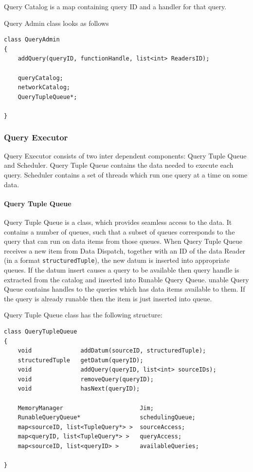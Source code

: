 \documentclass[11pt]{article}
\begin{document}
Query Catalog is a map containing query ID and a handler for that query. 

Query Admin class looks as follows
\begin{verbatim}
class QueryAdmin
{
    addQuery(queryID, functionHandle, list<int> ReadersID);

	queryCatalog;
	networkCatalog;
	QueryTupleQueue*;
	
}
\end{verbatim}

\subsubsection{Query Executor}

Query Executor consists of two inter dependent components: Query Tuple Queue and Scheduler. Query Tuple Queue contains the data needed to execute each query. Scheduler contains a set of threads which run one query at a time on some data.  

\paragraph{Query Tuple Queue}

Query Tuple Queue is a class, which provides seamless access to the data. It contains a number of queues, such that a subset of queues corresponds to the query that can run on data items from those queues. When Query Tuple Queue receives a new item from Data Dispatch, together with an ID of the data Reader (in a format {\tt structuredTuple}), the new datum is inserted into appropriate queues. If the datum insert causes a query to be available then query handle is extracted from the catalog and inserted into Runable Query Queue. unable Query Queue contains handles to the queries which has data items available to them. If the query is already runable then the item is just inserted into queue.

Query Tuple Queue class has the following structure:

\begin{verbatim}
class QueryTupleQueue
{
    void              addDatum(sourceID, structuredTuple);
    structuredTuple   getDatum(queryID);
    void              addQuery(queryID, list<int> sourceIDs);
    void              removeQuery(queryID);
    void              hasNext(queryID);

	MemoryManager                      Jim;
	RunableQueryQueue*                 schedulingQueue;
	map<sourceID, list<TupleQuery*> >  sourceAccess;
	map<queryID, list<TupleQuery*> >   queryAccess;
	map<sourceID, list<queryID> >      availableQueries;
	
}
\end{verbatim}
\end{document}
